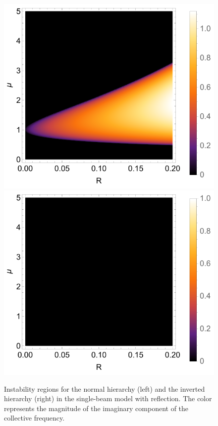 \begin{figure}[htbp]
    \includegraphics[width=\textwidth]{chapters/assets/halo/growth-rate-mu-refl-nh}
    \endminipage\hfill
    \includegraphics[width=\textwidth]{chapters/assets/halo/growth-rate-mu-refl-ih}
    \endminipage\hfill
    \caption{Instability regions for the normal hierarchy (left) and the inverted hierarchy (right) in the single-beam model with reflection. The color represents the magnitude of the imaginary component of the collective frequency.}
    \label{chap:halo-sec:line-sym-fig:instability-regions}
\end{figure}



